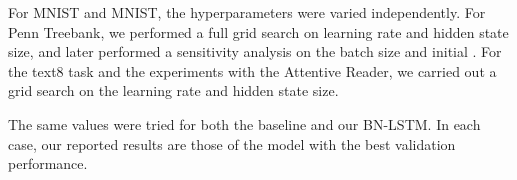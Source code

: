 \documentclass{article} \pdfoutput=1 \usepackage[utf8]{inputenc}
\begin{document}
\begin{table}[!hb]


  \caption{Hyperparameter values that have been explored in the experiments.}
  \label{tab:hyperparams}

\end{table}

For MNIST and MNIST, the hyperparameters were varied independently.
For Penn Treebank, we performed a full grid search on learning rate and hidden state size, and later performed a sensitivity analysis on the batch size and initial .
For the text8 task and the experiments with the Attentive Reader, we carried out a grid search on the learning rate and hidden state size.

The same values were tried for both the baseline and our BN-LSTM.
In each case, our reported results are those of the model with the best validation performance.
\end{document}
